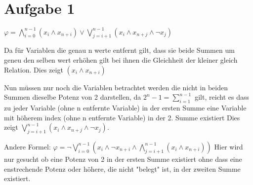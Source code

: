 \section*{Aufgabe 1}


$\varphi = \bigwedge_{i=0}^{n-1}(x_i \wedge x_{n+i}) \vee \bigvee_{j=i+1}^{n-1}( x_i \wedge x_{n+j} \wedge \neg x_{j})$ 

Da für Variablen die genau n werte entfernt gilt, dass sie beide Summen um geneu den selben wert erhöhen gilt bei ihnen die Gleichheit der kleiner gleich Relation. Dies zeigt $(x_i \wedge x_{n+i})$

Nun müssen nur noch die Variablen betrachtet werden die nicht in beiden Summen dieselbe Potenz von 2 darstellen, da $2^n-1 = \sum_{i=1}^{n-1}$ gilt, reicht es dass zu jeder Variable (ohne n entfernte Variable) in der ersten Summe eine Variable mit höherem index (ohne n entfernte Variable) in der 2. Summe  existiert
Dies zeigt $ \bigvee_{j=i+1}^{n-1}( x_i \wedge x_{n+j} \wedge \neg x_{j})$.

Andere Formel: $ \varphi = \neg \bigvee_{i=0}^{n-1}(x_i \wedge \neg x_{n+i} \wedge \bigwedge_{j=i+1}^{n-1} (x_i \wedge x_{n+i}))$ 
Hier wird nur gesucht ob eine Potenz von 2 in der ersten Summe existiert ohne dass eine enstrechende Potenz oder höhere, die nicht "belegt" ist, in der zweiten Summe existiert.